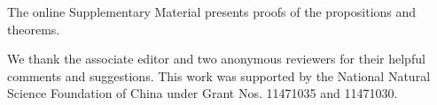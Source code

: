 \documentclass[12pt]{article} %
\newcommand{\bX}{\mathbf{X}}
\newcommand{\bJ}{\mathbf{J}}
\newcommand{\bC}{\mathbf{C}}
\theoremstyle{definition}
\begin{document}
%











\vskip 14pt

The online Supplementary Material presents proofs of the propositions and theorems.
\par
\vskip 14pt
We thank the associate editor and two anonymous reviewers for their helpful comments and suggestions.
This work was supported by the National Natural Science Foundation of
China under Grant Nos. 11471035 and 11471030.
\par
\end{document}

